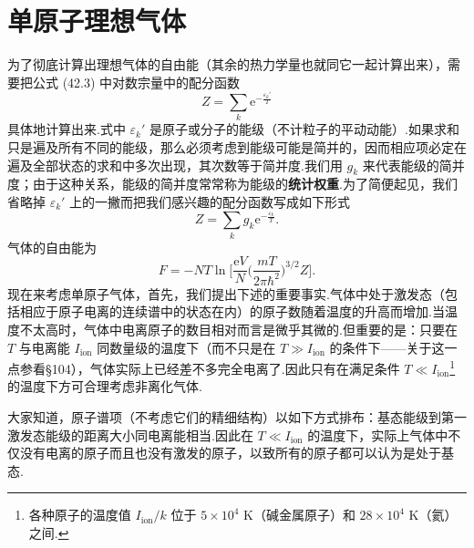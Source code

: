 \section{单原子理想气体}

为了彻底计算出理想气体的自由能（其余的热力学量也就同它一起计算出来），需要把公式 (42.3) 中对数宗量中的配分函数
\begin{equation*}
  Z=\sum_k\mathrm{e}^{-\frac{\varepsilon_k'}{T}}
\end{equation*}
具体地计算出来.式中 $\varepsilon_k'$ 是原子或分子的能级（不计粒子的平动动能）.如果求和只是遍及所有不同的能级，那么必须考虑到能级可能是简并的，因而相应项必定在遍及全部状态的求和中多次出现，其次数等于简并度.我们用 $g_k$ 来代表能级的简并度；由于这种关系，能级的简并度常常称为能级的\textbf{统计权重}.为了简便起见，我们省略掉 $\varepsilon_k'$ 上的一撇而把我们感兴趣的配分函数写成如下形式
\begin{equation}
  Z=\sum_k g_k\mathrm{e}^{-\frac{\varepsilon_k}{T}}.
\end{equation}
气体的自由能为
\begin{equation}
  F=-NT\ln\Big[\frac{\mathrm{e}V}{N}
  \Big(\frac{mT}{2\pi\hbar^2}\Big)^{3/2}Z\Big].
\end{equation}
现在来考虑单原子气体，首先，我们提出下述的重要事实.气体中处于激发态（包括相应于原子电离的连续谱中的状态在内）的原子数随着温度的升高而增加.当温度不太高时，气体中电离原子的数目相对而言是微乎其微的.但重要的是：只要在 $T$ 与电离能 $I_{\mathrm{ion}}$ 同数量级的温度下（而不只是在 $T\gg I_{\mathrm{ion}}$ 的条件下——关于这一点参看§104），气体实际上已经差不多完全电离了.因此只有在满足条件 $T\ll I_{\mathrm{ion}}$\footnote{各种原子的温度值 $I_{\mathrm{ion}}/k$ 位于 $5\times10^4$ K（碱金属原子）和 $28\times10^4$ K（氦）之间.} 的温度下方可合理考虑非离化气体.

大家知道，原子谱项（不考虑它们的精细结构）以如下方式排布：基态能级到第一激发态能级的距离大小同电离能相当.因此在 $T\ll I_{\mathrm{ion}}$ 的温度下，实际上气体中不仅没有电离的原子而且也没有激发的原子，以致所有的原子都可以认为是处于基态.

